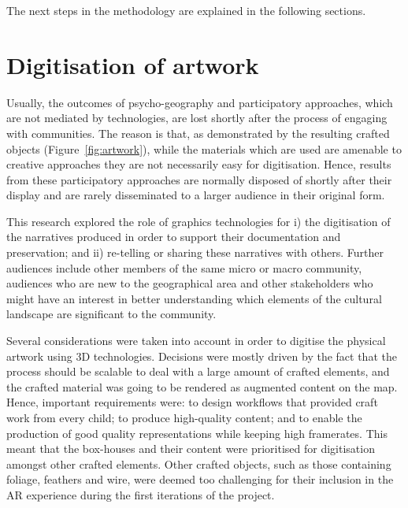 \documentclass[acmlarge,screen,dvipsnames]{acmart}
\begin{document}
The next steps in the methodology are explained in the following sections.

\section{Digitisation of artwork} 
\label{dig} 
Usually, the
outcomes of psycho-geography and participatory approaches, which are not
mediated by technologies, are lost shortly after the process of engaging with
communities. The reason is that, as demonstrated by the resulting crafted
objects (Figure~\ref{fig:artwork}), while the materials which are used  are
amenable to creative approaches they are not necessarily easy for
digitisation. Hence, results from these participatory approaches are normally
disposed of shortly after their display and are rarely disseminated to
 a larger audience in their original form. 

This research explored the role of graphics technologies for i) the
digitisation of the narratives produced in order to support their
documentation and preservation; and ii) re-telling or sharing these narratives with others.
Further audiences include other members of the same micro or macro community, audiences who are
new to the geographical area and other stakeholders who might have an interest
in better understanding which elements of the cultural landscape are
significant to the community.

Several considerations were taken into  account in order to digitise the
physical artwork using 3D technologies. Decisions were mostly driven by
the fact that the process should be scalable to deal with a large amount of
crafted elements, and the crafted material was going to be rendered
as augmented content on the map. Hence, important requirements were: to
design workflows that provided craft work from every child; to produce
high-quality content; and to enable the production of good quality
representations while keeping high framerates. This meant that
the box-houses and their content were prioritised for digitisation
amongst other crafted elements. Other crafted objects, such as those
containing foliage, feathers and wire, were deemed too challenging  for
their inclusion in the AR experience during the first iterations of the
project.
\end{document}
